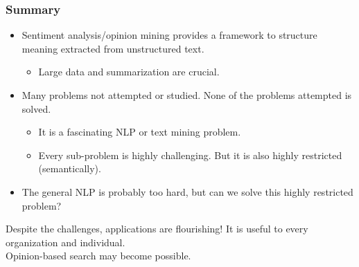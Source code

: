 \documentclass[t]{beamer}
\begin{document}

\begin{frame} \frametitle{Summary}

\begin{itemize}
\item Sentiment analysis/opinion mining provides a framework to
  structure meaning extracted from unstructured text. 
  \begin{itemize}
    \item Large data and summarization are crucial.
  \end{itemize}
\item Many problems not attempted or studied. None of the problems attempted is
solved. 
\begin{itemize}
\item It is a fascinating NLP or text mining problem. \\
\item Every sub-problem is highly challenging. But it is also highly restricted (semantically).
\end{itemize}

\item The general NLP is probably too hard, but can we solve this highly restricted problem?

\end{itemize}

\begin{block}{Despite the challenges, applications are flourishing!}
It is useful to every organization and individual. \\
Opinion-based search may become possible.
\end{block}

\end{frame}
\end{document}
